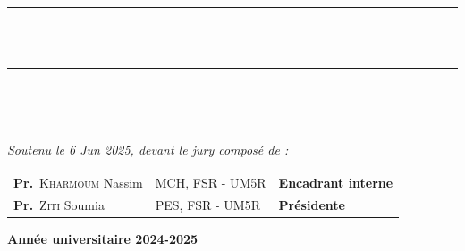 \begin{titlepage}
\begin{center}
    \rule{\linewidth}{0.3mm} \\[0.4cm]
    { \huge \bfseries\color{blue} \mytitle \\[0.4cm] }
    \rule{\linewidth}{0.3mm} \\[1cm]
    
    \begin{center}
    \begin{minipage}{\linewidth}
    \begin{flushright}
   
    \end{flushright}   
    \end{minipage}\\[2cm]
    \end{center} 
    {\large \textit{Soutenu le 6 Jun 2025, devant le jury composé de : }}\\[0.5cm]
    \color{black}
    \begin{tabular}{>{\arraybackslash}m{6cm} >{\arraybackslash}m{5cm} >{\arraybackslash}m{6cm}}
        \large \textbf{Pr.}~\textsc{Kharmoum} Nassim & MCH, FSR - UM5R      & \large \textbf{Encadrant interne} \\[0.1cm] 
        \large \textbf{Pr.}~\textsc{Ziti} Soumia     & PES, FSR - UM5R & \large \textbf{Présidente} \\[0.1cm]
               
    \end{tabular}
    
    \vfill
    {\textbf{\large {Année universitaire} 2024-2025}}
    \end{center}
    \end{titlepage}